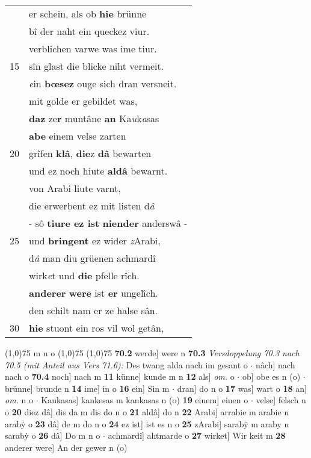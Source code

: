 \documentclass[8pt,a4paper,notitlepage]{article}
\begin{document}
\begin{table}[ht]
\begin{minipage}[t]{0.5\linewidth}
\begin{tabular}{rl}
 & er schein, als ob \textbf{hie} brünne\\ 
 & bî der naht ein queckez viur.\\ 
 & verblichen varwe was ime tiur.\\ 
15 & sîn glast die blicke niht vermeit.\\ 
 & \textit{e}in \textbf{bœsez} ouge sich dran versneit.\\ 
 & mit golde er gebildet was,\\ 
 & \textbf{daz} ze\textbf{r} muntâne \textbf{an} Ka\textit{u}k\textit{a}sas\\ 
 & \textbf{abe} einem velse zarten\\ 
20 & grîfen \textbf{klâ}, \textbf{die}z \textbf{dâ} bewarten\\ 
 & und ez noch hiute \textbf{aldâ} bewarnt.\\ 
 & von Arabi liute varnt,\\ 
 & die erwerbent ez mit listen d\textit{â}\\ 
 & - sô \textbf{tiure ez ist} \textbf{niender} anderswâ -\\ 
25 & und \textbf{bringent} ez wider \textit{z}Arabi,\\ 
 & d\textit{â} man diu grüenen achmardî\\ 
 & wirk\textit{e}t und \textbf{die} pfelle rîch.\\ 
 & \textbf{anderer} \textbf{were} ist \textbf{er} ungelîch.\\ 
 & den schilt nam er ze halse sân.\\ 
30 & \textbf{hie} stuont ein ros vil wol getân,\\ 
\end{tabular}
\scriptsize
\line(1,0){75} \newline
m n o \newline
\line(1,0){75} \newline
\newline
\line(1,0){75} \newline
\textbf{70.2} werde] were n \textbf{70.3} \textit{Versdoppelung 70.3 nach 70.5 (mit Anteil aus Vers 71.6):} Des twang alda nach im gesant o   $\cdot$ nâch] nach nach o \textbf{70.4} noch] nach m \textbf{11} künne] kunde m n \textbf{12} als] \textit{om.} o  $\cdot$ ob] obe es n (o)  $\cdot$ brünne] brunde n \textbf{14} ime] in o \textbf{16} ein] Sin m  $\cdot$ dran] do n o \textbf{17} was] wart o \textbf{18} an] \textit{om.} n o  $\cdot$ Kaukasas] kankesas m kankasas n (o) \textbf{19} einem] einen o  $\cdot$ velse] felsch n o \textbf{20} diez dâ] dis da m dis do n o \textbf{21} aldâ] do n \textbf{22} Arabi] arrabie m arabie n arabẏ o \textbf{23} dâ] de m do n o \textbf{24} ez ist] ist es n o \textbf{25} zArabi] sarabÿ m araby n sarabẏ o \textbf{26} dâ] Do m n o  $\cdot$ achmardî] ahtmarde o \textbf{27} wirket] Wir keit m \textbf{28} anderer were] An der gewer n (o) \newline
\end{minipage}
\end{table}
\end{document}
